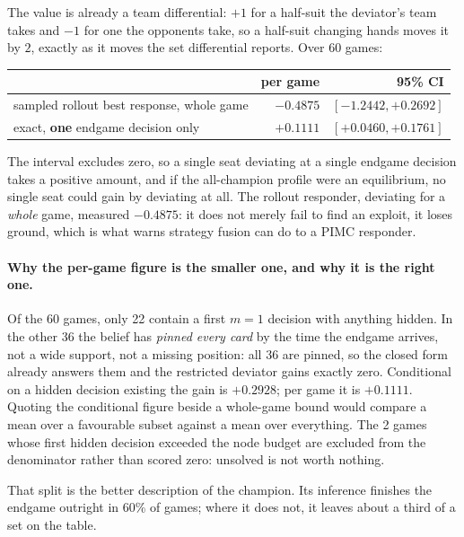\documentclass[11pt,letterpaper]{article}
\begin{document}
The value is already a team differential: $+1$ for a half-suit the deviator's
team takes and $-1$ for one the opponents take, so a half-suit changing hands
moves it by $2$, exactly as it moves the set differential
 reports. Over 60 games:

\begin{center}
\begin{tabular}{lrr}
\toprule
 & per game & 95\% CI \\
\midrule
sampled rollout best response, whole game & $-0.4875$ & $[-1.2442, +0.2692]$ \\
exact, \textbf{one} endgame decision only & $\mathbf{+0.1111}$ & $[+0.0460, +0.1761]$ \\
\bottomrule
\end{tabular}
\end{center}

The interval excludes zero, so a single seat deviating at a single endgame
decision takes a positive amount, and if the all-champion profile were an
equilibrium, no single seat could gain by deviating at all. The rollout
responder, deviating for a \emph{whole} game, measured $-0.4875$: it does not
merely fail to find an exploit, it loses ground, which is what
 warns strategy fusion can do to a PIMC
responder.

\paragraph{Why the per-game figure is the smaller one, and why it is the right
one.} Of the 60 games, only 22 contain a first $m = 1$ decision with
anything hidden. In the other 36 the belief has \emph{pinned every card} by
the time the endgame arrives, not a wide support, not a missing position:
all 36 are pinned, so the closed form already answers them and the
restricted deviator gains exactly zero. Conditional on a hidden decision
existing the gain is $+0.2928$; per game it is $+0.1111$. Quoting the conditional
figure beside a whole-game bound would compare a mean over a favourable subset
against a mean over everything. The 2 games whose first hidden decision
exceeded the node budget are excluded from the denominator rather than scored
zero: unsolved is not worth nothing.

That split is the better description of the champion. Its inference finishes
the endgame outright in 60\% of games; where it does not, it leaves about a
third of a set on the table.
\end{document}
